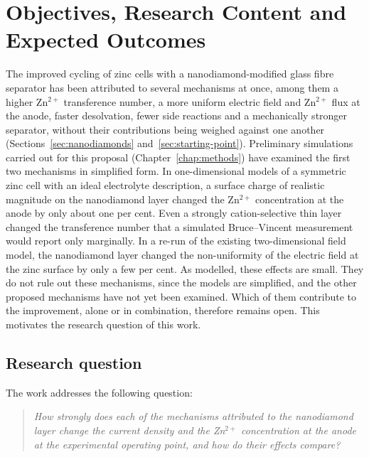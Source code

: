
\chapter{Objectives, Research Content and Expected Outcomes}
\label{chap:objectives}


The improved cycling of zinc cells with a nanodiamond-modified glass fibre separator has been attributed to several mechanisms at once, among them a higher Zn$^{2+}$ transference number, a more uniform electric field and Zn$^{2+}$ flux at the anode, faster desolvation, fewer side reactions and a mechanically stronger separator, without their contributions being weighed against one another (Sections~\ref{sec:nanodiamonds} and~\ref{sec:starting-point}).
Preliminary simulations carried out for this proposal (Chapter~\ref{chap:methods}) have examined the first two mechanisms in simplified form.
In one-dimensional models of a symmetric zinc cell with an ideal electrolyte description, a surface charge of realistic magnitude on the nanodiamond layer changed the Zn$^{2+}$ concentration at the anode by only about one per cent.
Even a strongly cation-selective thin layer changed the transference number that a simulated Bruce--Vincent measurement would report only marginally.
In a re-run of the existing two-dimensional field model, the nanodiamond layer changed the non-uniformity of the electric field at the zinc surface by only a few per cent.
As modelled, these effects are small.
They do not rule out these mechanisms, since the models are simplified, and the other proposed mechanisms have not yet been examined.
Which of them contribute to the improvement, alone or in combination, therefore remains open.
This motivates the research question of this work.

\section{Research question}

The work addresses the following question:
\begin{quote}
\itshape
How strongly does each of the mechanisms attributed to the nanodiamond layer change the current density and the Zn$^{2+}$ concentration at the anode at the experimental operating point, and how do their effects compare?
\end{quote}

